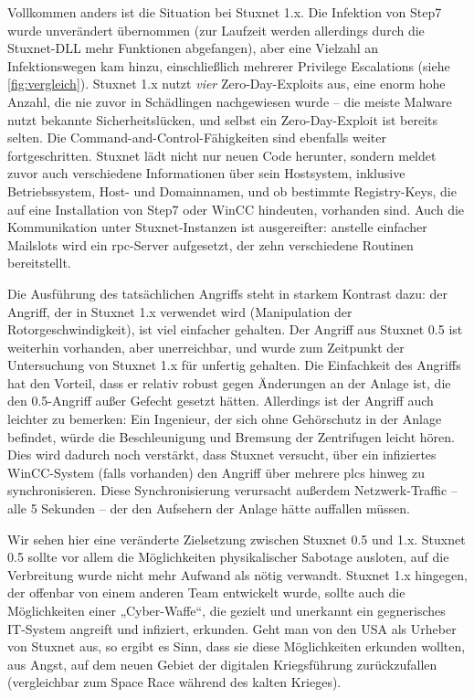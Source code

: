 \documentclass[a4paper]{article}
\begin{document}
Vollkommen anders ist die Situation bei Stuxnet 1.x.
Die Infektion von Step7 wurde unverändert übernommen (zur Laufzeit werden allerdings durch die Stuxnet-DLL mehr Funktionen abgefangen),
aber eine Vielzahl an Infektionswegen kam hinzu, einschließlich mehrerer Privilege Escalations (siehe \autoref{fig:vergleich}).
Stuxnet 1.x nutzt \emph{vier} Zero-Day-Exploits aus, eine enorm hohe Anzahl, die nie zuvor in Schädlingen nachgewiesen wurde –
die meiste Malware nutzt bekannte Sicherheitslücken, und selbst ein Zero-Day-Exploit ist bereits selten.
Die Command-and-Control-Fähigkeiten sind ebenfalls weiter fortgeschritten.
Stuxnet lädt nicht nur neuen Code herunter, sondern meldet zuvor auch verschiedene Informationen über sein Hostsystem,
inklusive Betriebssystem, Host- und Domainnamen, und ob bestimmte Registry-Keys, die auf eine Installation von Step7 oder WinCC hindeuten, vorhanden sind.
Auch die Kommunikation unter Stuxnet-Instanzen ist ausgereifter:
anstelle einfacher Mailslots wird ein \gls{rpc}-Server aufgesetzt, der zehn verschiedene Routinen bereitstellt. %

Die Ausführung des tatsächlichen Angriffs steht in starkem Kontrast dazu:
der Angriff, der in Stuxnet 1.x verwendet wird (Manipulation der Rotorgeschwindigkeit),
ist viel einfacher gehalten.
Der Angriff aus Stuxnet 0.5 ist weiterhin vorhanden, aber unerreichbar, und wurde zum Zeitpunkt der Untersuchung von Stuxnet 1.x für unfertig gehalten.\cite{dossier}
Die Einfachkeit des Angriffs hat den Vorteil, dass er relativ robust gegen Änderungen an der Anlage ist, die den 0.5-Angriff außer Gefecht gesetzt hätten.
Allerdings ist der Angriff auch leichter zu bemerken:
Ein Ingenieur, der sich ohne Gehörschutz in der Anlage befindet, würde die Beschleunigung und Bremsung der Zentrifugen leicht hören.
Dies wird dadurch noch verstärkt, dass Stuxnet versucht, über ein infiziertes WinCC-System (falls vorhanden) den Angriff über mehrere \glspl{plc} hinweg zu synchronisieren.
Diese Synchronisierung verursacht außerdem Netzwerk-Traffic – alle 5 Sekunden – der den Aufsehern der Anlage hätte auffallen müssen.

Wir sehen hier eine veränderte Zielsetzung zwischen Stuxnet 0.5 und 1.x.
Stuxnet 0.5 sollte vor allem die Möglichkeiten physikalischer Sabotage ausloten, auf die Verbreitung wurde nicht mehr Aufwand als nötig verwandt.
Stuxnet 1.x hingegen, der offenbar von einem anderen Team entwickelt wurde\cite{05}, %
sollte auch die Möglichkeiten einer „Cyber-Waffe“, die gezielt und unerkannt ein gegnerisches IT-System angreift und infiziert, erkunden.
Geht man von den USA als Urheber von Stuxnet aus, so ergibt es Sinn, dass sie diese Möglichkeiten erkunden wollten,
aus Angst, auf dem neuen Gebiet der digitalen Kriegsführung zurückzufallen (vergleichbar zum Space Race während des kalten Krieges).
\end{document}
